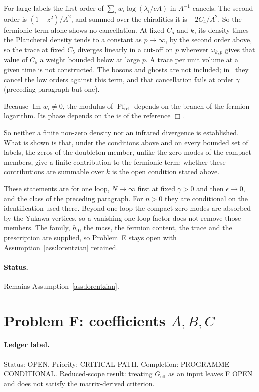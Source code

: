 For large labels the first order of \(\sum_iw_i\log(\lambda_i/cA)\) in \(A^{-1}\) cancels. The second order is \((1-z^2)/A^2\), and summed over the chiralities it is \(-2C_4/A^2\). So the fermionic term alone shows no cancellation. At fixed \(C_5\) and \(k\), its density times the Plancherel density tends to a constant as \(p\to\infty\), by the second order above, so the trace at fixed \(C_5\) diverges linearly in a cut-off on \(p\) wherever \(\omega_{k,p}\) gives that value of \(C_5\) a weight bounded below at large \(p\). A trace per unit volume at a given time is not constructed. The bosons and ghosts are not included; in~\cite{Steinacker2023} they cancel the low orders against this term, and that cancellation fails at order \(\gamma\) (preceding paragraph but one).

Because \(\operatorname{Im}w_i\neq0\), the modulus of \(\operatorname{Pf}_{\mathrm{rel}}\) depends on the branch of the fermion logarithm. Its phase depends on the \(\mathrm i\epsilon\) of the reference \(\Box\).

So neither a finite non-zero density nor an infrared divergence is established. What is shown is that, under the conditions above and on every bounded set of labels, the zeros of the doubleton member, unlike the zero modes of the compact members, give a finite contribution to the fermionic term; whether these contributions are summable over \(k\) is the open condition stated above.

These statements are for one loop, \(N\to\infty\) first at fixed \(\gamma>0\) and then \(\epsilon\to0\), and the class of the preceding paragraph. For \(n>0\) they are conditional on the identification used there. Beyond one loop the compact zero modes are absorbed by the Yukawa vertices, so a vanishing one-loop factor does not remove those members. The family, \(h_0\), the mass, the fermion content, the trace and the prescription are supplied, so Problem~E stays open with Assumption~\ref{ass:lorentzian} retained.

\paragraph{Status.}
Remains Assumption~\ref{ass:lorentzian}.

\section{Problem F: coefficients \(A,B,C\)}
\label{sec:status-F}

\paragraph{Ledger label.}
Status: OPEN. Priority: CRITICAL PATH. Completion:
PROGRAMME-CONDITIONAL. Reduced-scope result: treating
\(G_{\mathrm{eff}}\) as an input leaves F OPEN and does not satisfy
the matrix-derived criterion.

